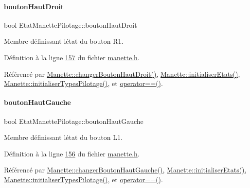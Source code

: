 \paragraph{\texorpdfstring{bouton\+Haut\+Droit}{boutonHautDroit}}
{\footnotesize\ttfamily bool Etat\+Manette\+Pilotage\+::bouton\+Haut\+Droit}



Membre définissant l\textquotesingle{}état du bouton R1. 



Définition à la ligne \hyperlink{manette_8h_source_l00157}{157} du fichier \hyperlink{manette_8h_source}{manette.\+h}.



Référencé par \hyperlink{manette_8cpp_source_l00486}{Manette\+::changer\+Bouton\+Haut\+Droit()}, \hyperlink{manette_8cpp_source_l00023}{Manette\+::initialiser\+Etats()}, \hyperlink{manette_8cpp_source_l00040}{Manette\+::initialiser\+Types\+Pilotage()}, et \hyperlink{manette_8cpp_source_l00613}{operator==()}.

\mbox{\label{struct_etat_manette_pilotage_aef8579e406e8766c1936db6da460492a}} 
\paragraph{\texorpdfstring{bouton\+Haut\+Gauche}{boutonHautGauche}}
{\footnotesize\ttfamily bool Etat\+Manette\+Pilotage\+::bouton\+Haut\+Gauche}



Membre définissant l\textquotesingle{}état du bouton L1. 



Définition à la ligne \hyperlink{manette_8h_source_l00156}{156} du fichier \hyperlink{manette_8h_source}{manette.\+h}.



Référencé par \hyperlink{manette_8cpp_source_l00479}{Manette\+::changer\+Bouton\+Haut\+Gauche()}, \hyperlink{manette_8cpp_source_l00023}{Manette\+::initialiser\+Etats()}, \hyperlink{manette_8cpp_source_l00040}{Manette\+::initialiser\+Types\+Pilotage()}, et \hyperlink{manette_8cpp_source_l00613}{operator==()}.

\mbox{\label{struct_etat_manette_pilotage_a78a791f6f8968042efd8e2f64f70f882}} 
